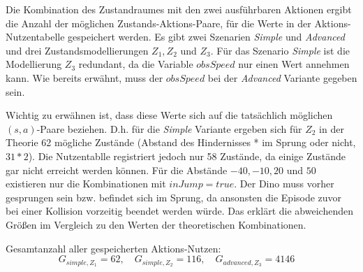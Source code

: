 Die Kombination des Zustandraumes mit den zwei ausführbaren Aktionen ergibt die Anzahl der möglichen Zustands-Aktions-Paare, für die Werte in der Aktions-Nutzentabelle gespeichert werden. Es gibt zwei Szenarien \textit{Simple} und \textit{Advanced} und drei Zustandsmodellierungen $Z_1, Z_2$ und $Z_3$.
Für das Szenario \textit{Simple} ist die Modellierung $Z_3$ redundant, da die Variable $obsSpeed$ nur einen Wert annehmen kann. Wie bereits erwähnt, muss der $obsSpeed$ bei der \textit{Advanced} Variante gegeben sein. 
\par 
Wichtig zu erwähnen ist, dass diese Werte sich auf die tatsächlich möglichen $(s,a)$-Paare beziehen. D.h. für die \textit{Simple} Variante ergeben sich für $Z_2$ in der Theorie 62 mögliche Zustände (Abstand des Hindernisses * im Sprung oder nicht, $31*2$). Die Nutzentablle registriert jedoch nur 58 Zustände, da einige Zustände gar nicht erreicht werden können. Für die Abstände $-40, -10, 20$ und $50$ existieren nur die Kombinationen mit $inJump = true$. Der Dino muss vorher gesprungen sein bzw. befindet sich im Sprung, da ansonsten die Episode zuvor bei einer Kollision vorzeitig beendet werden würde. Das erklärt die abweichenden Größen im Vergleich zu den Werten der theoretischen Kombinationen.
\par 
Gesamtanzahl aller gespeicherten Aktions-Nutzen:
\begin{equation}
G_{simple, Z_1} = 62, \quad
G_{simple, Z_2} = 116, \quad
G_{advanced, Z_3} = 4146 \quad 
\end{equation}


